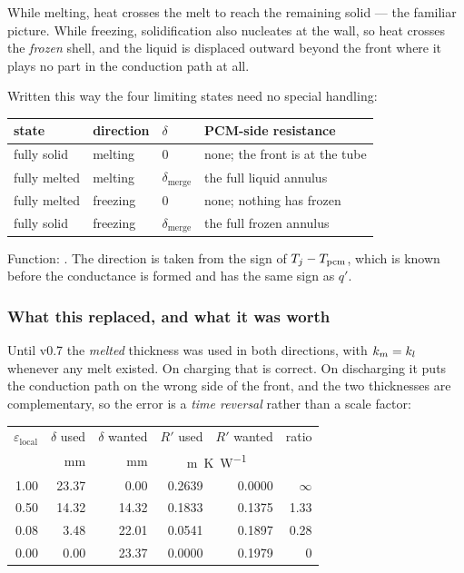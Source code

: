\noindent
While melting, heat crosses the melt to reach the remaining solid --- the
familiar picture. While freezing, solidification also nucleates at the wall, so
heat crosses the \emph{frozen} shell, and the liquid is displaced outward beyond
the front where it plays no part in the conduction path at all.

Written this way the four limiting states need no special handling:

\begin{center}
\begin{tabular}{@{}l l l l@{}}
\toprule
state & direction & $\delta$ & PCM-side resistance \\
\midrule
fully solid  & melting  & $0$                    & none; the front is at the tube \\
fully melted & melting  & $\delta_{\mathrm{merge}}$ & the full liquid annulus \\
fully melted & freezing & $0$                    & none; nothing has frozen \\
fully solid  & freezing & $\delta_{\mathrm{merge}}$ & the full frozen annulus \\
\bottomrule
\end{tabular}
\end{center}

\noindent
Function: . The direction is taken from the sign of
$T_{j}-T_{\mathrm{pcm}}$, which is known before the conductance is formed and has the same
sign as $q'$.

\subsubsection*{What this replaced, and what it was worth}

Until v0.7 the \emph{melted} thickness was used in both directions, with
$k_{m}=k_{l}$ whenever any melt existed. On charging that is correct. On
discharging it puts the conduction path on the wrong side of the front, and the
two thicknesses are complementary, so the error is a \emph{time reversal} rather
than a scale factor:

\begin{center}
\begin{tabular}{@{}r r r r r r@{}}
\toprule
$\varepsilon_{\mathrm{local}}$ & $\delta$ used & $\delta$ wanted
 & $R'$ used & $R'$ wanted & ratio \\
 & \si{\milli\meter} & \si{\milli\meter}
 & \multicolumn{2}{c}{\si{\meter\kelvin\per\watt}} & \\
\midrule
1.00 & 23.37 &  0.00 & 0.2639 & 0.0000 & $\infty$ \\
0.50 & 14.32 & 14.32 & 0.1833 & 0.1375 & 1.33 \\
0.08 &  3.48 & 22.01 & 0.0541 & 0.1897 & 0.28 \\
0.00 &  0.00 & 23.37 & 0.0000 & 0.1979 & 0 \\
\bottomrule
\end{tabular}
\end{center}

